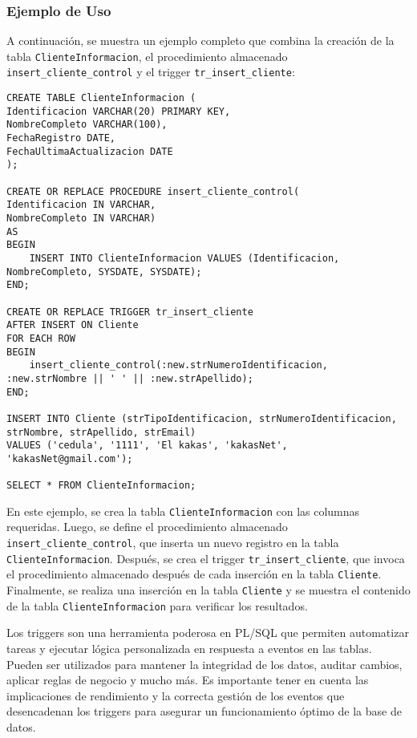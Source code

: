\documentclass[executivepaper]{article}
\begin{document}
\subsubsection*{Ejemplo de Uso}

A continuación, se muestra un ejemplo completo que combina la creación de la tabla \texttt{ClienteInformacion}, el procedimiento almacenado \texttt{insert\_cliente\_control} y el trigger \texttt{tr\_insert\_cliente}:

\begin{lstlisting}
CREATE TABLE ClienteInformacion (
Identificacion VARCHAR(20) PRIMARY KEY,
NombreCompleto VARCHAR(100),
FechaRegistro DATE,
FechaUltimaActualizacion DATE
);

CREATE OR REPLACE PROCEDURE insert_cliente_control(
Identificacion IN VARCHAR,
NombreCompleto IN VARCHAR)
AS
BEGIN
    INSERT INTO ClienteInformacion VALUES (Identificacion, NombreCompleto, SYSDATE, SYSDATE);
END;

CREATE OR REPLACE TRIGGER tr_insert_cliente
AFTER INSERT ON Cliente
FOR EACH ROW
BEGIN
    insert_cliente_control(:new.strNumeroIdentificacion, :new.strNombre || ' ' || :new.strApellido);
END;

INSERT INTO Cliente (strTipoIdentificacion, strNumeroIdentificacion, strNombre, strApellido, strEmail)
VALUES ('cedula', '1111', 'El kakas', 'kakasNet', 'kakasNet@gmail.com');

SELECT * FROM ClienteInformacion;
\end{lstlisting}

En este ejemplo, se crea la tabla \texttt{ClienteInformacion} con las columnas requeridas. Luego, se define el procedimiento almacenado \texttt{insert\_cliente\_control}, que inserta un nuevo registro en la tabla \texttt{ClienteInformacion}. Después, se crea el trigger \texttt{tr\_insert\_cliente}, que invoca el procedimiento almacenado después de cada inserción en la tabla \texttt{Cliente}. Finalmente, se realiza una inserción en la tabla \texttt{Cliente} y se muestra el contenido de la tabla \texttt{ClienteInformacion} para verificar los resultados.

Los triggers son una herramienta poderosa en PL/SQL que permiten automatizar tareas y ejecutar lógica personalizada en respuesta a eventos en las tablas. Pueden ser utilizados para mantener la integridad de los datos, auditar cambios, aplicar reglas de negocio y mucho más. Es importante tener en cuenta las implicaciones de rendimiento y la correcta gestión de los eventos que desencadenan los triggers para asegurar un funcionamiento óptimo de la base de datos.
\end{document}
